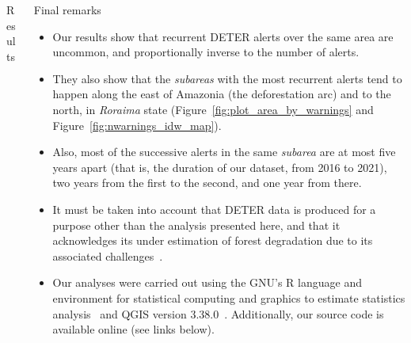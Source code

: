 \documentclass[20pt]{beamer}
\begin{document}
\begin{frame}[fragile,t]
\begin{columns}[t]
\begin{column}{0.33\linewidth}
\begin{block}{Results\vphantom{g}}
\vspace{0.3cm}

    \end{block}
\end{column}

%
%




\begin{column}{0.33\linewidth}

\vspace{0.5cm}

    \begin{block}{Final remarks\vphantom{g}}
        \begin{itemize}
            \item Our results show that recurrent DETER alerts over the same area are uncommon, and proportionally inverse to the number of alerts.
            \item They also show that the \textit{subareas} with the most recurrent alerts tend to happen along the east of Amazonia (the deforestation arc) and to the north, in \textit{Roraima} state (Figure~\ref{fig:plot_area_by_warnings} and Figure~\ref{fig:nwarnings_idw_map}).
            \item Also, most of the successive alerts in the same \textit{subarea} are at most five years apart (that is, the duration of our dataset, from 2016 to 2021), two years from the first to the second, and one year from there. 
            \item It must be taken into account that DETER data is produced for a purpose other than the analysis presented here, and that it acknowledges its under estimation of forest degradation due to its associated challenges~\cite{dealmeida2022}.
            \item Our analyses were carried out using the GNU's R language and environment for statistical computing and graphics to estimate statistics analysis~\cite{ihaka1996} and QGIS version 3.38.0~\cite{QGIS_software}. Additionally, our source code is available online (see links below).
        \end{itemize}
    \end{block}


\end{column}
\end{columns}
\end{frame}
\end{document}
